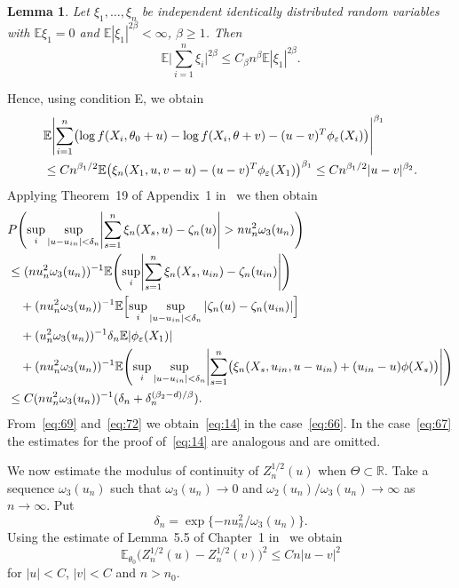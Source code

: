 \documentclass[11pt,a4paper]{article}
\newtheorem{lemma}[theorem]{Lemma}
\begin{document}
\begin{lemma}\label{lem:4.2}
Let $\xi_1,\dots,\xi_n$ be independent identically distributed random variables with $\mathbb{E}\xi_1=0$ and $\mathbb{E}|\xi_1|^{2\beta}<\infty$, $\beta\ge1$. Then
\begin{equation}
\mathbb{E}\Biggl|\sum_{i=1}^n\xi_i\Biggr|^{2\beta}\le C_\beta n^\beta\mathbb{E}|\xi_1|^{2\beta}.
\label{eq:70}
\end{equation}
\end{lemma}

Hence, using condition E, we obtain
\begin{align}
&\mathbb{E}\Biggl|\sum_{i=1}^n\bigl(\log f(X_i,\theta_0+u)-\log f(X_i,\theta+v)-(u-v)^T\phi_\varepsilon(X_i)\bigr)\Biggr|^{\beta_1}\notag\\
&\le Cn^{\beta_1/2}\mathbb{E}\bigl(\xi_n(X_1,u,v-u)-(u-v)^T\phi_\varepsilon(X_1)\bigr)^{\beta_1}\le Cn^{\beta_1/2}|u-v|^{\beta_2}.
\label{eq:71}
\end{align}
Applying Theorem~19 of Appendix~1 in~\cite{10} we then obtain
\begin{align}
&P\Biggl(\sup_i\sup_{|u-u_{in}|<\delta_n}\Biggl|\sum_{s=1}^n\xi_n(X_s,u)-\zeta_n(u)\Biggr|>nu_n^2\omega_3(u_n)\Biggr)\notag\\
&\le(nu_n^2\omega_3(u_n))^{-1}\mathbb{E}\Biggl(\sup_i\Biggl|\sum_{s=1}^n\xi_n(X_s,u_{in})-\zeta_n(u_{in})\Biggr|\Biggr)\notag\\
&\quad+(nu_n^2\omega_3(u_n))^{-1}\mathbb{E}\Bigl[\sup_i\sup_{|u-u_{in}|<\delta_n}|\zeta_n(u)-\zeta_n(u_{in})|\Bigr]\notag\\
&\quad+(u_n^2\omega_3(u_n))^{-1}\delta_n\mathbb{E}|\phi_\varepsilon(X_1)|\notag\\
&\quad+(nu_n^2\omega_3(u_n))^{-1}\mathbb{E}\Biggl(\sup_i\sup_{|u-u_{in}|<\delta_n}\Biggl|\sum_{s=1}^n\bigl(\xi_n(X_s,u_{in},u-u_{in})+(u_{in}-u)\phi(X_s)\bigr)\Biggr|\Biggr)\notag\\
&\le C(nu_n^2\omega_3(u_n))^{-1}(\delta_n+\delta_n^{(\beta_2-d)/\beta}).
\label{eq:72}
\end{align}
From~\eqref{eq:69} and~\eqref{eq:72} we obtain~\eqref{eq:14} in the case~\eqref{eq:66}. In the case~\eqref{eq:67} the estimates for the proof of~\eqref{eq:14} are analogous and are omitted.

We now estimate the modulus of continuity of $Z_n^{1/2}(u)$ when $\Theta\subset\mathbb{R}$. Take a sequence $\omega_3(u_n)$ such that $\omega_3(u_n)\to0$ and $\omega_2(u_n)/\omega_3(u_n)\to\infty$ as $n\to\infty$. Put
\[
\delta_n=\exp\{-nu_n^2/\omega_3(u_n)\}.
\]
Using the estimate of Lemma~5.5 of Chapter~1 in~\cite{10} we obtain
\begin{equation}
\mathbb{E}_{\theta_0}\bigl(Z_n^{1/2}(u)-Z_n^{1/2}(v)\bigr)^2\le Cn|u-v|^2
\label{eq:73}
\end{equation}
for $|u|<C$, $|v|<C$ and $n>n_0$.
\end{document}
